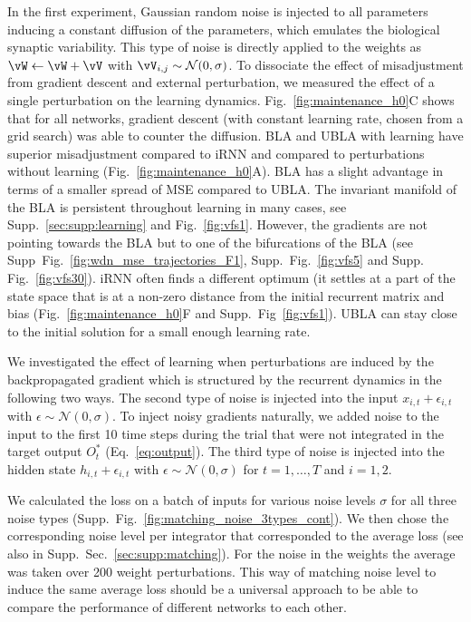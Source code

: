 \documentclass{article} %
\newcounter{ct}
\theoremstyle{definition}
\theoremstyle{remark}
\begin{document}
In the first experiment, Gaussian random noise is injected to all parameters inducing a constant diffusion of the parameters, which emulates the biological synaptic variability.
This type of noise is directly applied to the weights as $ \vW \leftarrow \vW + \vV$ with $\vV_{i,j}\sim\mathcal{N}(0,\sigma)$. To dissociate the effect of misadjustment from gradient descent and external perturbation, we measured the effect of a single perturbation on the learning dynamics.
Fig.~\ref{fig:maintenance_h0}C shows that for all networks, gradient descent (with constant learning rate, chosen from a grid search) was able to counter the diffusion.
BLA and UBLA with learning have superior misadjustment compared to iRNN and compared to perturbations without learning (Fig.~\ref{fig:maintenance_h0}A).
BLA has a slight advantage in terms of a smaller spread of MSE compared to UBLA.
The invariant manifold of the BLA is persistent throughout learning in many cases, see Supp.~\ref{sec:supp:learning} and Fig.~\ref{fig:vfs1}. However, the gradients are not pointing towards the BLA but to one of the bifurcations of the BLA (see Supp~Fig.~\ref{fig:wdn_mse_trajectories_F1}, Supp.~Fig.~\ref{fig:vfs5} and Supp. Fig.~\ref{fig:vfs30}).
iRNN often finds a different optimum (it settles at a part of the state space that is at a non-zero distance from the initial recurrent matrix and bias (Fig.~\ref{fig:maintenance_h0}F and Supp.~Fig~\ref{fig:vfs1}).
UBLA can stay close to the initial solution for a small enough learning rate.

We investigated the effect of learning when perturbations are induced by the backpropagated gradient which is structured by the recurrent dynamics in the following two ways.
The second type of noise is injected into the input $x_{i,t}+\epsilon_{i,t}$ with $\epsilon\sim\mathcal{N}(0,\sigma)$.
To inject noisy gradients naturally, we added noise to the input to the first 10 time steps during the trial that were not integrated in the target output $O_t^*$ (Eq.~\ref{eq:output}).
The third type of noise is injected into the hidden state $h_{i,t}+\epsilon_{i,t}$ with $\epsilon\sim\mathcal{N}(0,\sigma)$ for $t=1,\dots, T$ and $i=1,2$. 

We calculated the loss on a batch of inputs for various noise levels $\sigma$ for all three noise types (Supp.~Fig.~\ref{fig:matching_noise_3types_cont}).
We then chose the corresponding noise level per integrator that corresponded to the average loss (see also in Supp.~Sec.~\ref{sec:supp:matching}). For the noise in the weights the average was taken over 200 weight perturbations.
This way of matching noise level to induce the same average loss should be a universal approach to be able to compare the performance of different networks to each other.
\end{document}
